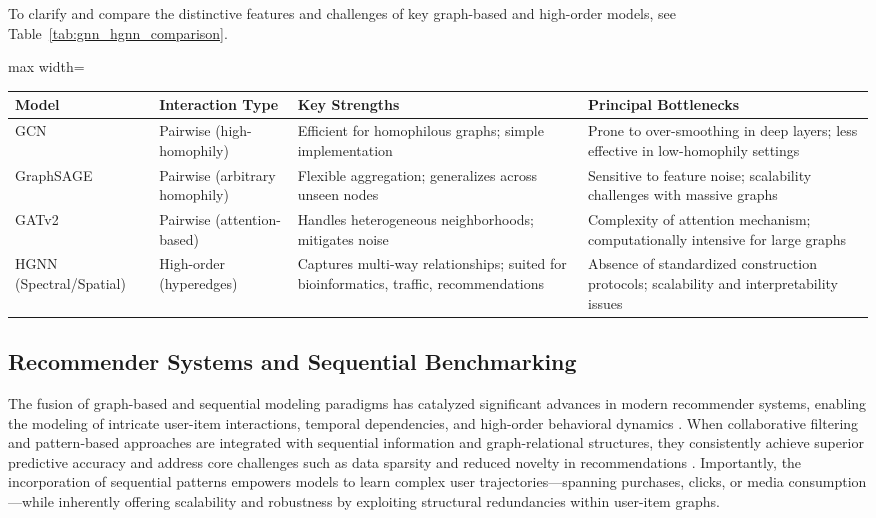 \documentclass[sigconf]{acmart}
\begin{document}
To clarify and compare the distinctive features and challenges of key graph-based and high-order models, see Table~\ref{tab:gnn_hgnn_comparison}.

\begin{table*}[htbp]
\centering
\caption{Comparison of Key Graph Neural and Hypergraph Neural Architectures}
\label{tab:gnn_hgnn_comparison}
\begin{adjustbox}{max width=\textwidth}
\begin{tabular}{llll}
\toprule
\textbf{Model} & \textbf{Interaction Type} & \textbf{Key Strengths} & \textbf{Principal Bottlenecks} \\
\midrule
GCN & Pairwise (high-homophily) & Efficient for homophilous graphs; simple implementation & Prone to over-smoothing in deep layers; less effective in low-homophily settings \\
GraphSAGE & Pairwise (arbitrary homophily) & Flexible aggregation; generalizes across unseen nodes & Sensitive to feature noise; scalability challenges with massive graphs \\
GATv2 & Pairwise (attention-based) & Handles heterogeneous neighborhoods; mitigates noise & Complexity of attention mechanism; computationally intensive for large graphs \\
HGNN (Spectral/Spatial) & High-order (hyperedges) & Captures multi-way relationships; suited for bioinformatics, traffic, recommendations & Absence of standardized construction protocols; scalability and interpretability issues \\
\bottomrule
\end{tabular}
\end{adjustbox}
\end{table*}

\subsection{Recommender Systems and Sequential Benchmarking}

The fusion of graph-based and sequential modeling paradigms has catalyzed significant advances in modern recommender systems, enabling the modeling of intricate user-item interactions, temporal dependencies, and high-order behavioral dynamics \cite{ref84}. When collaborative filtering and pattern-based approaches are integrated with sequential information and graph-relational structures, they consistently achieve superior predictive accuracy and address core challenges such as data sparsity and reduced novelty in recommendations \cite{ref84}. Importantly, the incorporation of sequential patterns empowers models to learn complex user trajectories—spanning purchases, clicks, or media consumption—while inherently offering scalability and robustness by exploiting structural redundancies within user-item graphs.
\end{document}
